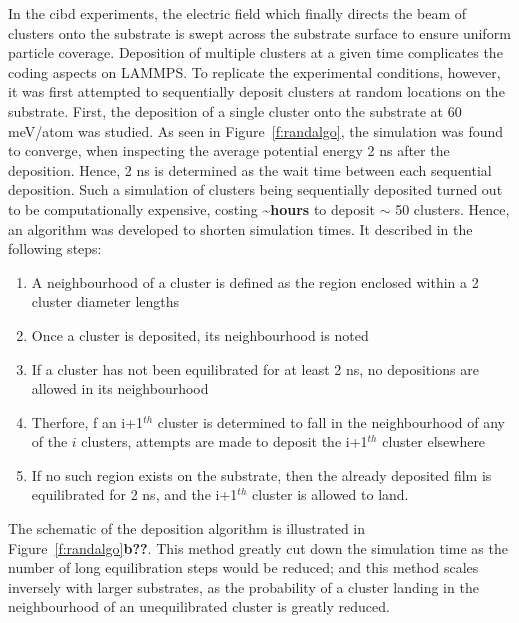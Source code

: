 In the \gls{cibd} experiments, the electric field which finally directs the beam of clusters onto the substrate is swept across the substrate surface to ensure uniform particle coverage. Deposition of multiple clusters at a given time complicates the coding aspects on LAMMPS. To replicate the experimental conditions, however, it was first attempted to sequentially deposit clusters at random locations on the substrate. First, the deposition of a single cluster onto the substrate at 60 meV/atom was studied. As seen in Figure~\ref{f:randalgo}, the simulation was found to converge, when inspecting the average potential energy 2 ns after the deposition. Hence, 2 ns is determined as the wait time between each sequential deposition. Such a simulation of clusters being sequentially deposited turned out to be computationally expensive, costing \sim \textbf{hours} to deposit $\sim$ 50 clusters. Hence, an algorithm was developed to shorten simulation times. It described in the following steps:

\begin{enumerate}
	\item A neighbourhood of a cluster is defined as the region enclosed within a 2 cluster diameter lengths
	\item Once a cluster is deposited, its neighbourhood is noted
	\item If a cluster has not been equilibrated for at least 2 ns, no depositions are allowed in its neighbourhood
	\item Therfore, f an i+1$^{th}$ cluster is determined to fall in the neighbourhood of any of the $i$ clusters, attempts are made to deposit the i+1$^{th}$ cluster elsewhere
	\item If no such region exists on the substrate, then the already deposited film is equilibrated for 2 ns, and the i+1$^{th}$ cluster is allowed to land.
\end{enumerate}

The schematic of the deposition algorithm is illustrated in Figure~\ref{f:randalgo}\textbf{b??}. This method greatly cut down the simulation time as the number of long equilibration steps would be reduced; and this method scales inversely with larger substrates, as the probability of a cluster landing in the neighbourhood of an unequilibrated cluster is greatly reduced.

